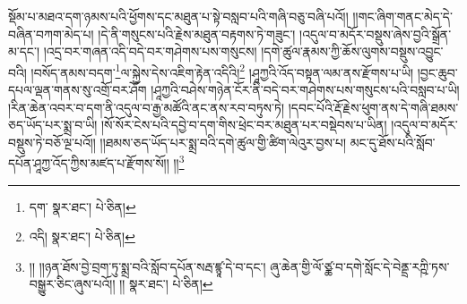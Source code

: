 སྡོམ་པ་མཐའ་དག་ཉམས་པའི་ཕྱོགས་དང་མཐུན་པ་སྟེ་བསླབ་པའི་གཞི་བཅུ་བཞི་པའོ།། །།གང་ཞིག་གནང་མེད་དེ་བཞིན་བཀག་མེད་པ། །དེ་ནི་གསུངས་པའི་རྗེས་མཐུན་བརྟགས་ཏེ་གཟུང་། །འདུལ་བ་མདོར་བསྡུས་ཞེས་བྱའི་སྒྲོན་མ་དང་། །འདྲ་བར་གཞན་འདི་བདེ་བར་གཤེགས་པས་གསུངས། །དགེ་ཚུལ་རྣམས་ཀྱི་ཆོས་ལུགས་བསྡུས་འབྱུང་བའི། །བསོད་ནམས་བདག་\footnote{དག་  སྣར་ཐང་།  པེ་ཅིན། }ལ་སྐྱེས་དེས་འཇིག་རྟེན་འདིའི།\footnote{འདི།  སྣར་ཐང་།  པེ་ཅིན། } །ཤཱཀྱའི་འོད་བསྟན་ལམ་ནས་རྫོགས་པ་ཡི། །བྱང་ཆུབ་དཔལ་ལྡན་གནས་སུ་འགྲོ་བར་ཤོག །ཤཱཀྱའི་བཤེས་གཉེན་ངོར་ནི་བདེ་བར་གཤེགས་པས་གསུངས་པའི་བསླབ་པ་ཡི། །རིན་ཆེན་འབར་བ་དག་ནི་འདུལ་བ་རྒྱ་མཚོའི་ནང་ནས་རབ་བཏུས་ཏེ། །དབང་པོའི་རྡོ་རྗེས་ཕུག་ནས་དེ་གཞི་ཐམས་ཅད་ཡོད་པར་སྨྲ་བ་ཡི། །སོ་སོར་ངེས་པའི་དབྱེ་བ་དག་གིས་ཕྲེང་བར་མཐུན་པར་བསྡེབས་པ་ཡིན། །འདུལ་བ་མདོར་བསྡུས་ཏེ་བཅོ་ལྔ་པའོ།། །།ཐམས་ཅད་ཡོད་པར་སྨྲ་བའི་དགེ་ཚུལ་གྱི་ཚིག་ལེའུར་བྱས་པ། མང་དུ་ཐོས་པའི་སློབ་དཔོན་ཤཱཀྱ་འོད་ཀྱིས་མཛད་པ་རྫོགས་སོ།། །།\footnote{།། །།ཉན་ཐོས་བྱེ་བྲག་ཏུ་སྨྲ་བའི་སློབ་དཔོན་སརྦ་ཛྙཱ་དེ་བ་དང་། ཞུ་ཆེན་གྱི་ལོ་ཙྪ་བ་དགེ་སློང་དེ་བེནྡྲ་རཀྵི་ཏས་བསྒྱུར་ཅིང་ཞུས་པའོ།། །།  སྣར་ཐང་།  པེ་ཅིན། }